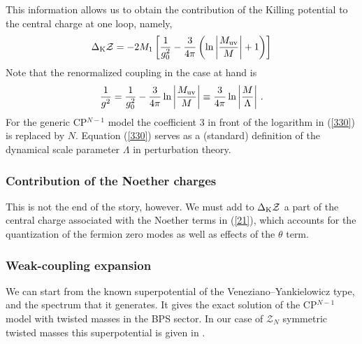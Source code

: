 \documentclass[epsfig,12pt]{article}
\def\beq{\begin{equation}}
\def\eeq{\end{equation}}
\def\beq{\begin{equation}}
\def\eeq{\end{equation}}
\newcommand{\mc}[1]{\mathcal{#1}}
\begin{document}
	This information allows us to obtain the contribution of the Killing potential to the central charge at one loop, namely,
\beq
\Delta_{\rm K}{\mathcal Z} = -2M_1\left[\frac{1}{g_0^2} -
\frac{3}{4\pi} \left(\ln\left|\frac{M_{\rm uv}}{M} 
\right| +1
\right)
\right]
\label{329}
\eeq
	Note that the renormalized coupling in the case at hand is \cite{Novikov:1984ac}
\beq
\frac{1}{g^2}=
\frac{1}{g_0^2} -
\frac{3}{4\pi}  \ln\left|\frac{M_{\rm uv}}{M} \right | \equiv   \frac{3}{4\pi}  \ln\left|\frac{M}{\Lambda}\right|\,.
\label{330}
\eeq
	For the generic CP$^{N-1}$ model the coefficient 3 in front of the logarithm 
	in (\ref{330}) is replaced by $N$. 
	Equation (\ref{330}) serves as a (standard) definition of the dynamical scale parameter $\Lambda$ 
	in perturbation theory.



\subsubsection{Contribution of the Noether charges}

This is not the end of the story, however. We must add to $\Delta_{\rm K}{\mathcal Z}$
a part of the central charge associated with the Noether terms in (\ref{21}), which accounts for the quantization of the
fermion zero modes as well as effects of the $\theta$ term.




\subsubsection{Weak-coupling expansion}

       We can start from the known superpotential of the Veneziano--Yankielowicz type, and the spectrum that it generates.
       It gives the  exact solution of the CP$^{N-1}$ model with twisted masses in the BPS sector. 
       In our case of $\mc{Z}_N$ symmetric twisted masses this superpotential is given in \cite{Bolokhov:2011mp}.
       
\end{document}
